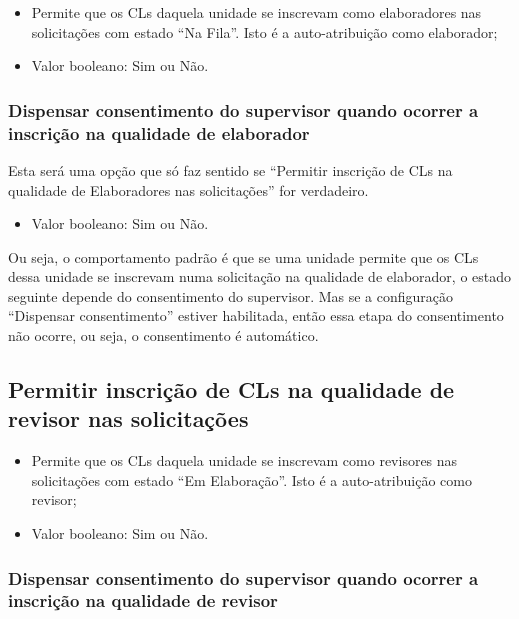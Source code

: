 \begin{itemize}
	\item Permite que os CLs daquela unidade se inscrevam como elaboradores nas solicitações com estado ``Na Fila''. Isto é a auto-atribuição como elaborador;
	
	\item Valor booleano: Sim ou Não.	
\end{itemize}

\subsubsection{Dispensar consentimento do supervisor quando ocorrer a inscrição na qualidade de elaborador}

Esta será uma opção que só faz sentido se ``Permitir inscrição de CLs na qualidade de Elaboradores nas solicitações'' for verdadeiro.

\begin{itemize}
	\item Valor booleano: Sim ou Não.	
\end{itemize}

Ou seja, o comportamento padrão é que se uma unidade permite que os CLs dessa unidade se inscrevam numa solicitação na qualidade de elaborador, o estado seguinte depende do consentimento do supervisor. Mas se a configuração ``Dispensar consentimento'' estiver habilitada, então essa etapa do consentimento não ocorre, ou seja, o consentimento é automático.

\subsection{Permitir inscrição de CLs na qualidade de revisor nas solicitações}

\begin{itemize}
	\item Permite que os CLs daquela unidade se inscrevam como revisores nas solicitações com estado ``Em Elaboração''. Isto é a auto-atribuição como revisor;
	
	\item Valor booleano: Sim ou Não.	
\end{itemize}

\subsubsection{Dispensar consentimento do supervisor quando ocorrer a inscrição na qualidade de revisor}

